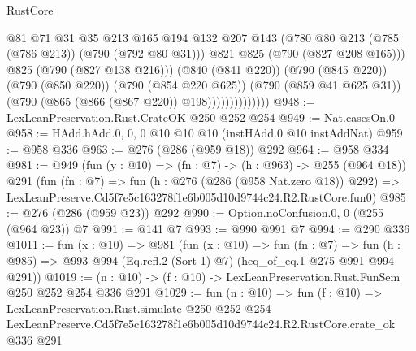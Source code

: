 \begin{lexlean}{RustCore}
\begin{coremodule}
                                @81
                                @71
                                @31
                                @35
                                @213
                                @165
                                @194
                                @132
                                @207
                                @143
                                (@780 @80 @213 (@785 (@786 @213)) (@790 (@792 @80 @31)))
                                @821
                                @825
                                (@790 (@827 @208 @165)))
                              @825
                              (@790 (@827 @138 @216)))
                            (@840 (@841 @220))
                            (@790 (@845 @220))
                            (@790 (@850 @220))
                            (@790 (@854 @220 @625))
                            (@790 (@859 @41 @625 @31))
                            (@790 (@865 (@866 (@867 @220)) @198))))))))))))))
@948 := LexLeanPreservation.Rust.CrateOK @250 @252 @254
@949 := Nat.casesOn.{0}
@958 := HAdd.hAdd.{0, 0, 0} @10 @10 @10 (instHAdd.{0} @10 instAddNat)
@959 := @958 @336
@963 := @276 (@286 (@959 @18)) @292
@964 := @958 @334
@981 := @949
    (fun (y : @10) => (fn : @7) -> (h : @963) -> @255 (@964 @18))
    @291
    (fun (fn : @7) =>
    fun (h : @276 (@286 (@958 Nat.zero @18)) @292) =>
    LexLeanPreserve.Cd5f7e5c163278f1e6b005d10d9744c24.R2.RustCore.fun0)
@985 := @276 (@286 (@959 @23)) @292
@990 := Option.noConfusion.{0, 0} (@255 (@964 @23)) @7
@991 := @141 @7
@993 := @990 @991 @7
@994 := @290 @336
@1011 := fun (x : @10) =>
  @981
    (fun (x : @10) =>
    fun (fn : @7) =>
    fun (h : @985) => @993 @994 (Eq.refl.{2} (Sort 1) @7) (heq_of_eq.{1} @275 @991 @994 @291))
@1019 := (n : @10) -> (f : @10) -> LexLeanPreservation.Rust.FunSem @250 @252 @254 @336 @291
@1029 := fun (n : @10) =>
  fun (f : @10) =>
  LexLeanPreservation.Rust.simulate
    @250
    @252
    @254
    LexLeanPreserve.Cd5f7e5c163278f1e6b005d10d9744c24.R2.RustCore.crate_ok
    @336
    @291
\end{coremodule}
\end{lexlean}
